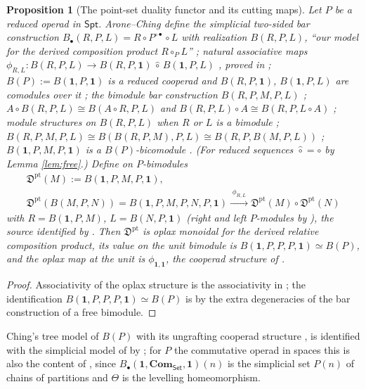 \documentclass[11pt]{amsart}
\newtheorem{proposition}[subsection]{Proposition}
\theoremstyle{definition}
\theoremstyle{remark}
\newcommand{\Spt}{\mathsf{Spt}}
\newcommand{\Com}{\mathbf{Com}}
\newcommand{\unit}{\mathbf{1}}
\newcommand{\Fptpt}{\mathfrak{D}^{\mathrm{pt}}}
\begin{document}
\begin{proposition}[The point-set duality functor and its cutting maps]\label{prop:b}
Let $P$ be a reduced operad in $\Spt$. Arone--Ching define the simplicial two-sided bar construction $B_\bullet(R,P,L)=R\circ P^{\circ\bullet}\circ L$ with realization $B(R,P,L)$, ``our model for the derived composition product $R\circ_P L$'' \cite[Definition 7.14]{AC1}; natural associative maps $\phi_{R,L}\colon B(R,P,L)\to B(R,P,\unit)\,\hat\circ\,B(\unit,P,L)$ \cite[Proposition 7.15]{AC1}, proved in \cite[\S 7.3]{Ch05}; $B(P):=B(\unit,P,\unit)$ is a reduced cooperad and $B(R,P,\unit)$, $B(\unit,P,L)$ are comodules over it \cite[Corollary 7.16]{AC1}; the bimodule bar construction $B(R,P,M,P,L)$ \cite[Definition 7.17]{AC1}; $A\circ B(R,P,L)\cong B(A\circ R,P,L)$ and $B(R,P,L)\circ A\cong B(R,P,L\circ A)$ \cite[Proposition 7.19]{AC1}; module structures on $B(R,P,L)$ when $R$ or $L$ is a bimodule \cite[Definition 7.20]{AC1}; $B(R,P,M,P,L)\cong B(B(R,P,M),P,L)\cong B(R,P,B(M,P,L))$ \cite[Remark 7.21]{AC1}; $B(\unit,P,M,P,\unit)$ is a $B(P)$-bicomodule \cite[Corollary 7.22]{AC1}. (For reduced sequences $\hat\circ=\circ$ by Lemma \ref{lem:free}.) Define on $P$-bimodules
\begin{gather*} \Fptpt(M):=B(\unit,P,M,P,\unit),\\ \Fptpt(B(M,P,N))=B(\unit,P,M,P,N,P,\unit)\xrightarrow{\;\phi_{R,L}\;}\Fptpt(M)\circ\Fptpt(N) \end{gather*}
with $R=B(\unit,P,M)$, $L=B(N,P,\unit)$ (right and left $P$-modules by \cite[Definition 7.20]{AC1}), the source identified by \cite[Remark 7.21]{AC1}. Then $\Fptpt$ is oplax monoidal for the derived relative composition product, its value on the unit bimodule is $B(\unit,P,P,P,\unit)\simeq B(P)$, and the oplax map at the unit is $\phi_{\unit,\unit}$, the cooperad structure of \cite[Corollary 7.16]{AC1}.
\end{proposition}
\begin{proof}
Associativity of the oplax structure is the associativity in \cite[Proposition 7.15]{AC1}; the identification $B(\unit,P,P,P,\unit)\simeq B(P)$ is by the extra degeneracies of the bar construction of a free bimodule.
\end{proof}

Ching's tree model of $B(P)$ with its ungrafting cooperad structure \cite[\S 4]{Ch05}, \cite[Definition 2.1]{Ch12} is identified with the simplicial model of \cite[Corollary 7.16]{AC1} by \cite[\S 7.3]{Ch05}; for $P$ the commutative operad in spaces this is also the content of \cite[Theorem A.24, Propositions A.35, A.37]{Cl2}, since $B_\bullet(\unit,\Com_{\mathsf{Set}},\unit)(n)$ is the simplicial set $P(n)$ of chains of partitions and $\Theta$ is the levelling homeomorphism.
\end{document}
